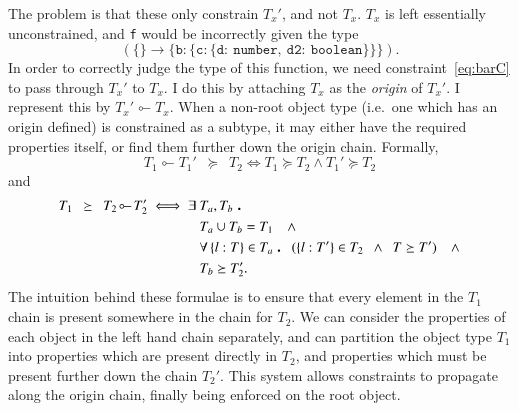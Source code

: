 \documentclass[12pt,a4paper,twoside,openright]{report}
\theoremstyle{definition}
\theoremstyle{dotless}
\newcommand*{\js}{\texttt}
\newcommand*{\orig}{\ensuremath{\!\multimapinv\!}}
\newcommand\qdot{\mathbin{\scalebox{1.5}{.}}\enspace}
\begin{document}
The problem is that these only constrain $T_x'$, and not $T_x$. $T_x$ is
left essentially unconstrained, and \js{f} would be incorrectly given the type
$$\mathtt{(\mathtt{\{\} \rightarrow \{b:\{c:\{d:\ number,\ d2:\ boolean\}\}\}})}.$$ In order to
correctly judge the type of this function, we need constraint~\eqref{eq:barC}
to pass through $T_x'$ to $T_x$. I do this by attaching $T_x$ as the
\textit{origin} of $T_x'$. I represent this by $T_x'\orig T_x$. When a
non-root object type (i.e.~one which has an origin defined) is constrained as a
subtype, it may either have the required properties itself, or find them
further down the origin chain. Formally,
\begin{equation}
  T_1\orig T_1'\enspace \succeq \enspace T_2 \iff T_1\succeq T_2 \land T_1' \succeq T_2
\end{equation}
and
\begin{equation}
  \begin{split}
	T_1\enspace \succeq\enspace T_2\orig T_2' \iff \exists\ & T_a, T_b\ \qdot\\
	& T_a\cup T_b = T_1 \quad\land \\
	& \forall \left\{l: T\right\} \in T_a \qdot (\{l: T'\}\in T_2\enspace \land \enspace T \succeq T') \quad\land \\
	& T_b \succeq T_2'.
  \end{split}
  \label{succeq}
\end{equation}
The intuition behind these formulae is to ensure that every element in the
$T_1$ chain is present somewhere in the chain for $T_2$.  We can consider the
properties of each object in the left hand chain separately, and can partition
the object type $T_1$ into properties which are present directly in $T_2$, and
properties which must be present further down the chain $T_2'$.
This system allows constraints to propagate along the origin chain, finally
being enforced on the root object.
\end{document}
